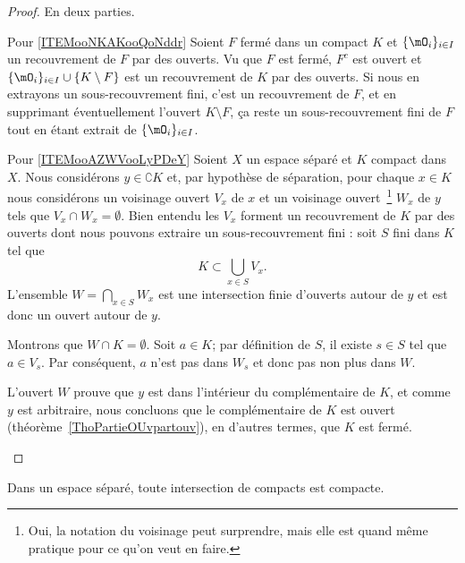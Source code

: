 \begin{proof}
    En deux parties.
    \begin{subproof}
    \item[Pour \ref{ITEMooNKAKooQoNddr}]
    Soient \( F\) fermé dans un compact \( K\) et \( \{ \mO_i \}_{i\in I}\) un recouvrement de \( F\) par des ouverts. Vu que \( F\) est fermé, \( F^c\) est ouvert et \( \{ \mO_i \}_{i\in I}\cup\{ K\setminus F \}\) est un recouvrement de \( K\) par des ouverts. Si nous en extrayons un sous-recouvrement fini, c'est un recouvrement de \( F\), et en supprimant éventuellement l'ouvert \( K\setminus F\), ça reste un sous-recouvrement fini de \( F\) tout en étant extrait de \( \{ \mO_i \}_{i\in I}\).

\item[Pour \ref{ITEMooAZWVooLyPDeY}]
    Soient \( X\) un espace séparé et \( K\) compact dans \( X\). Nous considérons \( y \in\complement K\) et, par hypothèse de séparation, pour chaque \( x\in K\) nous considérons un voisinage ouvert \( V_x\) de \( x\) et un voisinage ouvert~\footnote{Oui, la notation du voisinage peut surprendre, mais elle est quand même pratique pour ce qu'on veut en faire.} \( W_x\) de \( y\) tels que \( V_x\cap W_x=\emptyset\). Bien entendu les \( V_x\) forment un recouvrement de \( K\) par des ouverts dont nous pouvons extraire un sous-recouvrement fini : soit \( S\) fini dans \( K\) tel que
    \begin{equation}
        K\subset\bigcup_{x\in S}V_x.
    \end{equation}
    L'ensemble \( W=\bigcap_{x\in S}W_x\) est une intersection finie d'ouverts autour de \( y\) et est donc un ouvert autour de \( y\). 
    
    Montrons que \( W\cap K=\emptyset\). Soit \( a\in K\); par définition de \( S\), il existe \( s\in S\) tel que \( a\in V_s\). Par conséquent, \( a\) n'est pas dans \( W_s\) et donc pas non plus dans \( W\).

    L'ouvert \( W\) prouve que \( y\) est dans l'intérieur du complémentaire de \( K\), et comme \( y \) est arbitraire, nous concluons que le complémentaire de \( K\) est ouvert (théorème~\ref{ThoPartieOUvpartouv}), en d'autres termes, que \( K\) est fermé.
    \end{subproof}
\end{proof}

\begin{proposition}     \label{PROPooQWHSooXeJOkT}
    Dans un espace séparé, toute intersection de compacts est compacte.
\end{proposition}

